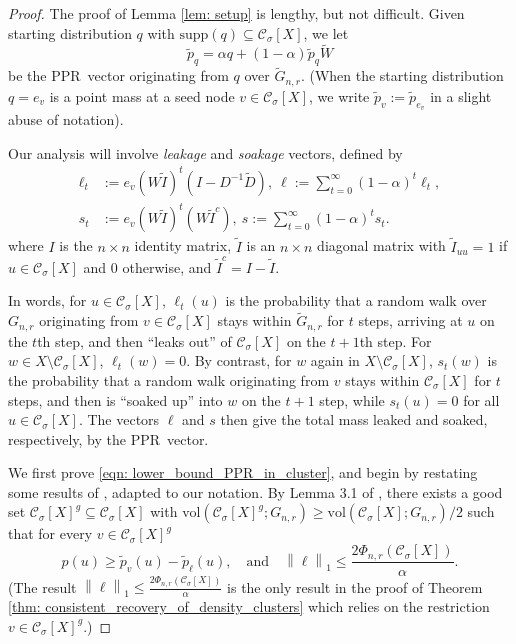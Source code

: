 \documentclass[11pt,twoside]{article}
\newcommand{\vol}{\mathrm{vol}}
\newcommand{\norm}[1]{\left\lVert#1\right\rVert}
\newcommand{\1}{\mathbf{1}}
\newcommand{\pbf}{p}        %
\newcommand{\Xbf}{X}             %
\newcommand{\Wbf}{W}
\newcommand{\Dbf}{D}
\newcommand{\Cset}{\mathcal{C}}
\newcommand{\Csig}{\Cset_{\sigma}}
\newcommand{\pprspace}{{\sc PPR~}}
\newcommand{\wDbf}{\widetilde{\Dbf}}
\begin{document}
\begin{proof}
	The proof of Lemma \ref{lem: setup} is lengthy, but not difficult. Given starting distribution $q$ with $\mathrm{supp}(q) \subseteq \Csig[\Xbf]$, we let
	\begin{equation}
	\widetilde{\pbf}_q = \alpha q + (1 - \alpha) \widetilde{\pbf}_{q} \widetilde{\Wbf}
	\end{equation}
	be the \pprspace vector originating from $q$ over $\widetilde{G}_{n,r}$. (When the starting distribution $q = e_v$ is a point mass at a seed node $v \in \Csig[\Xbf]$, we write $\widetilde{\pbf}_v := \widetilde{\pbf}_{e_v}$ in a slight abuse of notation).
	
	Our analysis will involve \emph{leakage} and \emph{soakage} vectors, defined by
	\begin{align}
	\label{eqn: leakage_soakage}
	\ell_t & := e_v (\Wbf \widetilde{I} )^t (I - \Dbf^{-1} \wDbf),~ \ell := \sum_{t = 0}^{\infty} (1 - \alpha)^t \ell_t, \nonumber \\
	s_t & := e_v (\Wbf \widetilde{I} )^t (\Wbf \widetilde{I}^c),~ s := \sum_{t = 0}^{\infty} (1 - \alpha)^{t} s_t.
	\end{align}
	where $I$ is the $n \times n$ identity matrix, $\widetilde{I}$ is an $n \times n$ diagonal matrix with $\widetilde{I}_{uu} = 1$ if $u \in \Csig[\Xbf]$ and $0$ otherwise, and $\widetilde{I}^c = I - \widetilde{I}$.
	
	In words, for $u \in \Csig[\Xbf]$, $\ell_t(u)$ is the probability that a random walk over $G_{n,r}$ originating from $v \in \Csig[\Xbf]$ stays within $\widetilde{G}_{n,r}$ for $t$ steps, arriving at $u$ on the $t$th step, and then ``leaks out'' of $\Csig[\Xbf]$ on the $t + 1$th step. For $w \in \Xbf \setminus \Csig[\Xbf]$, $\ell_t(w) = 0$. By contrast, for $w$ again in $\Xbf \setminus \Csig[\Xbf]$, $s_t(w)$ is the probability that a random walk originating from $v$ stays within $\Csig[\Xbf]$ for $t$ steps, and then is ``soaked up'' into $w$ on the $t + 1$ step, while $s_t(u) = 0$ for all $u \in \Csig[\Xbf]$. The vectors $\ell$ and $s$ then give the total mass leaked and soaked, respectively, by the \pprspace vector. 
	
	We first prove \eqref{eqn: lower_bound_PPR_in_cluster}, and begin by restating some results of \citep{zhu2013}, adapted to our notation. By Lemma 3.1 of \citep{zhu2013}, there exists a good set $\Csig[\Xbf]^g \subseteq \Csig[\Xbf]$ with $\vol(\Csig[\Xbf]^g; G_{n,r}) \geq \vol(\Csig[\Xbf]; G_{n,r})/2$ such that for every $v \in \Csig[\Xbf]^g$
	\begin{equation}
	\label{eqn: zhulemma3.1}
	\pbf(u) \geq \widetilde{\pbf}_v(u) - \widetilde{\pbf}_{\ell}(u), \quad \textrm{and} \quad \norm{\ell}_1 \leq \frac{2 \Phi_{n,r}(\Csig[\Xbf])}{\alpha}.
	\end{equation}
	(The result $\norm{\ell}_1 \leq \frac{2 \Phi_{n,r}(\Csig[\Xbf])}{\alpha}$ is the only result in the proof of Theorem \ref{thm: consistent_recovery_of_density_clusters} which relies on the restriction $v \in \Csig[\Xbf]^g$.)
	

\end{proof}
\end{document}
